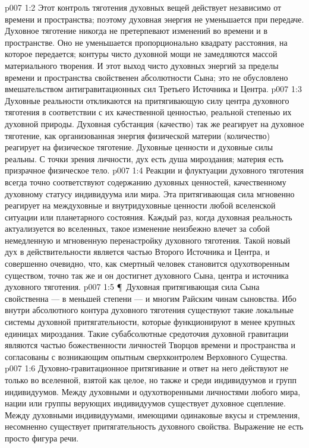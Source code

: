 \vs p007 1:2 Этот контроль тяготения духовных вещей действует независимо от времени и пространства; поэтому духовная энергия не уменьшается при передаче. Духовное тяготение никогда не претерпевают изменений во времени и в пространстве. Оно не уменьшается пропорционально квадрату расстояния, на которое передается; контуры чисто духовной мощи не замедляются массой материального творения. И этот выход чисто духовных энергий за пределы времени и пространства свойственен абсолютности Сына; это не обусловлено вмешательством антигравитационных сил Третьего Источника и Центра.
\vs p007 1:3 Духовные реальности откликаются на притягивающую силу центра духовного тяготения в соответствии с их качественной ценностью, реальной степенью их духовной природы. Духовная субстанция (качество) так же реагирует на духовное тяготение, как организованная энергия физической материи (количество) реагирует на физическое тяготение. Духовные ценности и духовные силы реальны. С точки зрения личности, дух есть душа мироздания; материя есть призрачное физическое тело.
\vs p007 1:4 Реакции и флуктуации духовного тяготения всегда точно соответствуют содержанию духовных ценностей, качественному духовному статусу индивидуума или мира. Эта притягивающая сила мгновенно реагирует на междуховные и внутридуховные ценности любой вселенской ситуации или планетарного состояния. Каждый раз, когда духовная реальность актуализуется во вселенных, такое изменение неизбежно влечет за собой немедленную и мгновенную перенастройку духовного тяготения. Такой новый дух в действительности является частью Второго Источника и Центра, и совершенно очевидно, что, как смертный человек становится одухотворенным существом, точно так же и он достигнет духовного Сына, центра и источника духовного тяготения.
\vs p007 1:5 \P\ Духовная притягивающая сила Сына свойственна --- в меньшей степени --- и многим Райским чинам сыновства. Ибо внутри абсолютного контура духовного тяготения существуют такие локальные системы духовной притягательности, которые функционируют в менее крупных единицах мироздания. Такие субабсолютные средоточия духовной гравитации являются частью божественности личностей Творцов времени и пространства и согласованы с возникающим опытным сверхконтролем Верховного Существа.
\vs p007 1:6 Духовно\hyp{}гравитационное притягивание и ответ на него действуют не только во вселенной, взятой как целое, но также и среди индивидуумов и групп индивидуумов. Между духовными и одухотворенными личностями любого мира, нации или группы верующих индивидуумов существует духовное сцепление. Между духовными индивидуумами, имеющими одинаковые вкусы и стремления, несомненно существует притягательность духовного свойства. Выражение  не есть просто фигура речи.
